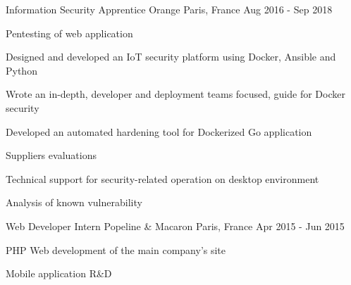 

\begin{cventries}

  \cventry
    {Information Security Apprentice } %
    {Orange} %
    {Paris, France} %
    {Aug 2016 - Sep 2018} %
    {
      \begin{cvitems} %
        \item {Pentesting of web application}
        \item {Designed and developed an IoT security platform using Docker, Ansible and Python}
        \item {Wrote an in-depth, developer and deployment teams focused, guide for Docker security}
        \item {Developed an automated hardening tool for Dockerized Go application}
        \item {Suppliers evaluations}
        \item {Technical support for security-related operation on desktop environment}
        \item {Analysis of known vulnerability}
      \end{cvitems}
    }
  \cventry
    {Web Developer Intern} %
    {Popeline \& Macaron} %
    {Paris, France} %
    {Apr 2015 - Jun 2015} %
    {
      \begin{cvitems} %
        \item {PHP Web development of the main company's site}
        \item {Mobile application R\&D}
      \end{cvitems}
    }
\end{cventries}
